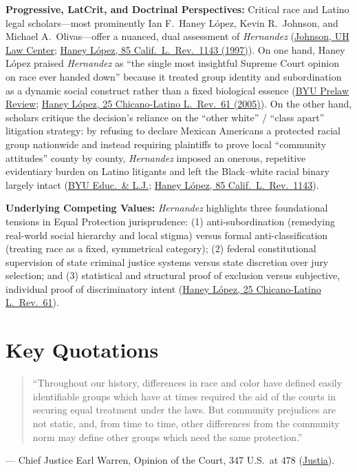 \documentclass[12pt]{article}
\begin{document}
\textbf{Progressive, LatCrit, and Doctrinal Perspectives:} Critical race and Latino legal scholars---most prominently Ian F.\ Haney L\'{o}pez, Kevin R.\ Johnson, and Michael A.\ Olivas---offer a nuanced, dual assessment of \textit{Hernandez} (\href{https://www.law.uh.edu/hernandez50/KevinJohnson.pdf}{Johnson, UH Law Center}; \href{https://lawcat.berkeley.edu/record/1116303/files/fulltext.pdf}{Haney L\'{o}pez, 85 Calif.\ L.\ Rev.\ 1143 (1997)}). On one hand, Haney L\'{o}pez praised \textit{Hernandez} as ``the single most insightful Supreme Court opinion on race ever handed down'' because it treated group identity and subordination as a dynamic social construct rather than a fixed biological essence (\href{https://scholarsarchive.byu.edu/cgi/viewcontent.cgi?article=1129&context=byuplr}{BYU Prelaw Review}; \href{https://escholarship.org/content/qt43t5940z/qt43t5940z.pdf}{Haney L\'{o}pez, 25 Chicano-Latino L.\ Rev.\ 61 (2005)}). On the other hand, scholars critique the decision's reliance on the ``other white'' / ``class apart'' litigation strategy: by refusing to declare Mexican Americans a protected racial group nationwide and instead requiring plaintiffs to prove local ``community attitudes'' county by county, \textit{Hernandez} imposed an onerous, repetitive evidentiary burden on Latino litigants and left the Black--white racial binary largely intact (\href{https://digitalcommons.law.byu.edu/cgi/viewcontent.cgi?article=1231&context=elj}{BYU Educ.\ \& L.J.}; \href{https://lawcat.berkeley.edu/record/1116303/files/fulltext.pdf}{Haney L\'{o}pez, 85 Calif.\ L.\ Rev.\ 1143}).

\textbf{Underlying Competing Values:} \textit{Hernandez} highlights three foundational tensions in Equal Protection jurisprudence: (1) anti-subordination (remedying real-world social hierarchy and local stigma) versus formal anti-classification (treating race as a fixed, symmetrical category); (2) federal constitutional supervision of state criminal justice systems versus state discretion over jury selection; and (3) statistical and structural proof of exclusion versus subjective, individual proof of discriminatory intent (\href{https://escholarship.org/content/qt43t5940z/qt43t5940z.pdf}{Haney L\'{o}pez, 25 Chicano-Latino L.\ Rev.\ 61}).

\section{Key Quotations}
\begin{quote}
``Throughout our history, differences in race and color have defined easily identifiable groups which have at times required the aid of the courts in securing equal treatment under the laws. But community prejudices are not static, and, from time to time, other differences from the community norm may define other groups which need the same protection.''
\end{quote}
\noindent --- Chief Justice Earl Warren, Opinion of the Court, 347 U.S.\ at 478 (\href{https://supreme.justia.com/cases/federal/us/347/475/}{Justia}).
\end{document}
